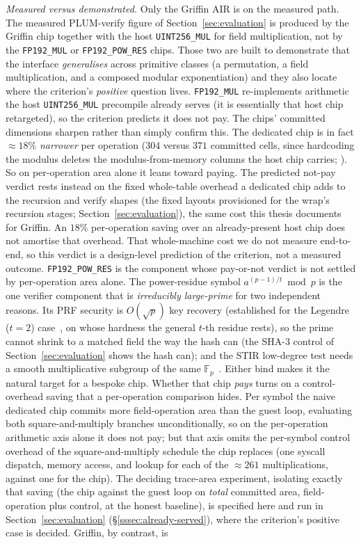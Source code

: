 \emph{Measured versus demonstrated.} Only the Griffin AIR is on the measured path. The measured PLUM-verify figure of Section~\ref{sec:evaluation} is produced by the Griffin chip together with the host \texttt{UINT256\_MUL} for field multiplication, not by the \texttt{FP192\_MUL} or \texttt{FP192\_POW\_RES} chips. Those two are built to demonstrate that the interface \emph{generalises} across primitive classes (a permutation, a field multiplication, and a composed modular exponentiation) and they also locate where the criterion's \emph{positive} question lives. \texttt{FP192\_MUL} re-implements arithmetic the host \texttt{UINT256\_MUL} precompile already serves (it is essentially that host chip retargeted), so the criterion predicts it does not pay. The chips' committed dimensions sharpen rather than simply confirm this. The dedicated chip is in fact ${\approx}18\%$ \emph{narrower} per operation ($304$ versus $371$ committed cells, since hardcoding the modulus deletes the modulus-from-memory columns the host chip carries; ). So on per-operation area alone it leans toward paying. The predicted not-pay verdict rests instead on the fixed whole-table overhead a dedicated chip adds to the recursion and verify shapes (the fixed layouts provisioned for the wrap's recursion stages; Section~\ref{sec:evaluation}), the same cost this thesis documents for Griffin. An $18\%$ per-operation saving over an already-present host chip does not amortise that overhead. That whole-machine cost we do not measure end-to-end, so this verdict is a design-level prediction of the criterion, not a measured outcome. \texttt{FP192\_POW\_RES} is the component whose pay-or-not verdict is not settled by per-operation area alone. The power-residue symbol $a^{(p-1)/t}\bmod p$ is the one verifier component that is \emph{irreducibly large-prime} for two independent reasons. Its PRF security is $O(\sqrt p)$ key recovery (established for the Legendre ($t{=}2$) case~\cite{khovratovich2019legendre,may2022legendre}, on whose hardness the general $t$-th residue rests), so the prime cannot shrink to a matched field the way the hash can (the SHA-3 control of Section~\ref{sec:evaluation} shows the hash can); and the STIR low-degree test needs a smooth multiplicative subgroup of the same $\mathbb{F}_p$~\cite{cryptoeprint:2024/390}. Either bind makes it the natural target for a bespoke chip. Whether that chip \emph{pays} turns on a control-overhead saving that a per-operation comparison hides. Per symbol the naive dedicated chip commits more field-operation area than the guest loop, evaluating both square-and-multiply branches unconditionally, so on the per-operation arithmetic axis alone it does not pay; but that axis omits the per-symbol control overhead of the square-and-multiply schedule the chip replaces (one syscall dispatch, memory access, and lookup for each of the ${\approx}261$ multiplications, against one for the chip). The deciding trace-area experiment, isolating exactly that saving (the chip against the guest loop on \emph{total} committed area, field-operation plus control, at the honest baseline), is specified here and run in Section~\ref{sec:evaluation} (\S\ref{sssec:already-served}), where the criterion's positive case is decided. Griffin, by contrast, is 